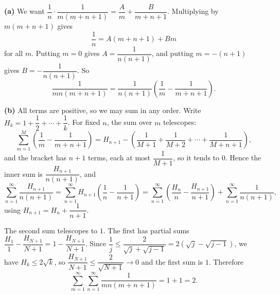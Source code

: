 \textbf{(a)} We want $\dfrac{1}{n}\cdot\dfrac{1}{m(m+n+1)}=\dfrac{A}{m}+\dfrac{B}{m+n+1}$. Multiplying by $m(m+n+1)$ gives
\[\dfrac{1}{n}=A(m+n+1)+Bm\]
for all $m$. Putting $m=0$ gives $A=\dfrac{1}{n(n+1)}$, and putting $m=-(n+1)$ gives $B=-\dfrac{1}{n(n+1)}$. So
\[\dfrac{1}{mn(m+n+1)}=\dfrac{1}{n(n+1)}\left(\dfrac{1}{m}-\dfrac{1}{m+n+1}\right).\]

\textbf{(b)} All terms are positive, so we may sum in any order. Write $H_k=1+\dfrac{1}{2}+\cdots+\dfrac{1}{k}$. For fixed $n$, the sum over $m$ telescopes:
\[\sum_{m=1}^{M}\left(\dfrac{1}{m}-\dfrac{1}{m+n+1}\right)=H_{n+1}-\left(\dfrac{1}{M+1}+\dfrac{1}{M+2}+\cdots+\dfrac{1}{M+n+1}\right),\]
and the bracket has $n+1$ terms, each at most $\dfrac{1}{M+1}$, so it tends to $0$. Hence the inner sum is $\dfrac{H_{n+1}}{n(n+1)}$, and
\[\sum_{n=1}^{\infty}\dfrac{H_{n+1}}{n(n+1)}=\sum_{n=1}^{\infty}H_{n+1}\left(\dfrac{1}{n}-\dfrac{1}{n+1}\right)=\sum_{n=1}^{\infty}\left(\dfrac{H_n}{n}-\dfrac{H_{n+1}}{n+1}\right)+\sum_{n=1}^{\infty}\dfrac{1}{n(n+1)},\]
using $H_{n+1}=H_n+\dfrac{1}{n+1}$.

The second sum telescopes to $1$. The first has partial sums $\dfrac{H_1}{1}-\dfrac{H_{N+1}}{N+1}=1-\dfrac{H_{N+1}}{N+1}$. Since $\dfrac{1}{j}\le\dfrac{2}{\sqrt j+\sqrt{j-1}}=2\left(\sqrt j-\sqrt{j-1}\right)$, we have $H_k\le2\sqrt k$, so $\dfrac{H_{N+1}}{N+1}\le\dfrac{2}{\sqrt{N+1}}\to0$ and the first sum is $1$. Therefore
\[\sum_{m=1}^{\infty}\sum_{n=1}^{\infty}\dfrac{1}{mn(m+n+1)}=1+1=\boxed{2}.\]
